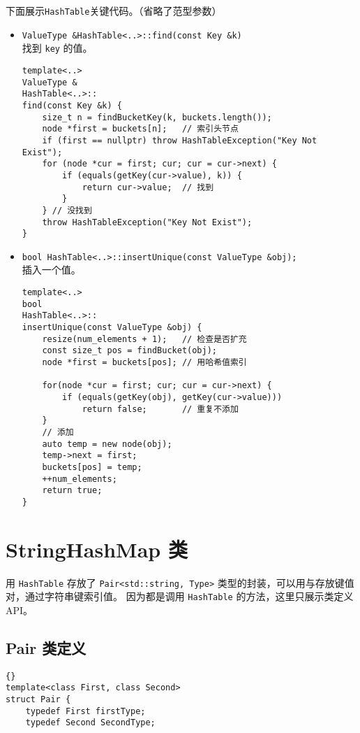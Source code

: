 {下面展示\lstinline{HashTable}关键代码。（省略了范型参数）

\begin{itemize}
      \item \lstinline{ValueType &HashTable<..>::find(const Key &k)}\\
            找到 \lstinline{key} 的值。
\begin{lstlisting}
template<..>
ValueType &
HashTable<..>::
find(const Key &k) {
    size_t n = findBucketKey(k, buckets.length());
    node *first = buckets[n];   // 索引头节点
    if (first == nullptr) throw HashTableException("Key Not Exist");
    for (node *cur = first; cur; cur = cur->next) {
        if (equals(getKey(cur->value), k)) {
            return cur->value;  // 找到
        }
    } // 没找到
    throw HashTableException("Key Not Exist");
}\end{lstlisting}
      \item \lstinline{bool HashTable<..>::insertUnique(const ValueType &obj);} \\
            插入一个值。
\begin{lstlisting}[escapechar=^,]
template<..>
bool
HashTable<..>::
insertUnique(const ValueType &obj) {
    resize(num_elements + 1);   // 检查是否扩充
    const size_t pos = findBucket(obj);
    node *first = buckets[pos]; // 用哈希值索引

    for(node *cur = first; cur; cur = cur->next) {
        if (equals(getKey(obj), getKey(cur->value)))
            return false;       // 重复不添加
    }
    // 添加
    auto temp = new node(obj);
    temp->next = first;
    buckets[pos] = temp;
    ++num_elements;
    return true;
}\end{lstlisting}
\end{itemize}


\section{StringHashMap 类}

用 \lstinline{HashTable} 存放了 \lstinline{Pair<std::string, Type>} 类型的封装，可以用与存放键值对，通过字符串键索引值。%
因为都是调用 \lstinline{HashTable} 的方法，这里只展示类定义 API。


\subsection{Pair 类定义}
\begin{lstlisting}[firstnumber=551, caption=Pair 类定义]{}
template<class First, class Second>
struct Pair {
    typedef First firstType;
    typedef Second SecondType;


\end{lstlisting}}
